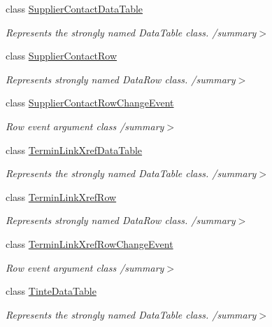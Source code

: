 \begin{DoxyCompactItemize}
class \hyperlink{class_products_1_1_data_1_1ds_sage_1_1_supplier_contact_data_table}{Supplier\+Contact\+Data\+Table}
\begin{DoxyCompactList}\small\item\em Represents the strongly named Data\+Table class. /summary$>$ \end{DoxyCompactList}\item 
class \hyperlink{class_products_1_1_data_1_1ds_sage_1_1_supplier_contact_row}{Supplier\+Contact\+Row}
\begin{DoxyCompactList}\small\item\em Represents strongly named Data\+Row class. /summary$>$ \end{DoxyCompactList}\item 
class \hyperlink{class_products_1_1_data_1_1ds_sage_1_1_supplier_contact_row_change_event}{Supplier\+Contact\+Row\+Change\+Event}
\begin{DoxyCompactList}\small\item\em Row event argument class /summary$>$ \end{DoxyCompactList}\item 
class \hyperlink{class_products_1_1_data_1_1ds_sage_1_1_termin_link_xref_data_table}{Termin\+Link\+Xref\+Data\+Table}
\begin{DoxyCompactList}\small\item\em Represents the strongly named Data\+Table class. /summary$>$ \end{DoxyCompactList}\item 
class \hyperlink{class_products_1_1_data_1_1ds_sage_1_1_termin_link_xref_row}{Termin\+Link\+Xref\+Row}
\begin{DoxyCompactList}\small\item\em Represents strongly named Data\+Row class. /summary$>$ \end{DoxyCompactList}\item 
class \hyperlink{class_products_1_1_data_1_1ds_sage_1_1_termin_link_xref_row_change_event}{Termin\+Link\+Xref\+Row\+Change\+Event}
\begin{DoxyCompactList}\small\item\em Row event argument class /summary$>$ \end{DoxyCompactList}\item 
class \hyperlink{class_products_1_1_data_1_1ds_sage_1_1_tinte_data_table}{Tinte\+Data\+Table}
\begin{DoxyCompactList}\small\item\em Represents the strongly named Data\+Table class. /summary$>$ \end{DoxyCompactList}\item 

\end{DoxyCompactItemize}

